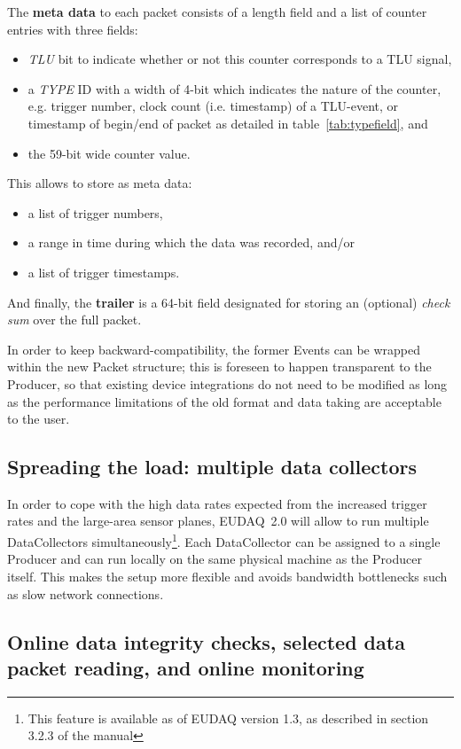 \documentclass[paper=a4, fontsize=11pt, titlepage]{scrartcl}	%
\numberwithin{equation}{section}		%
\numberwithin{figure}{section}			%
\numberwithin{table}{section}           	%
\begin{document}
The \textbf{meta data} to each packet consists of a length field and a
  list of counter entries with three fields: 
  \begin{itemize}
  \item \emph{TLU} bit to indicate whether or not this counter
    corresponds to a TLU signal,
  \item a \emph{TYPE} ID with a width of 4-bit which indicates the nature of the counter,
    e.g. trigger number, clock count (i.e. timestamp) of a TLU-event, or
    timestamp of begin/end of packet as detailed in table~\ref{tab:typefield}, and
  \item the 59-bit wide counter value.
  \end{itemize}
  This allows to store as meta data:
  \begin{itemize}
  \item a list of trigger numbers,
  \item a range in time during which the data was recorded, and/or
  \item a list of trigger timestamps.
  \end{itemize}

And finally, the \textbf{trailer} is a 64-bit field designated for
storing an (optional) \emph{check sum} over the full packet.

In order to keep backward-compatibility, the former Events can be
wrapped within the new Packet structure; this is foreseen to happen
transparent to the Producer, so that existing device integrations do
not need to be modified as long as the performance limitations of the
old format and data taking are acceptable to the user.


\subsection{Spreading the load: multiple data collectors}
\label{sec:datacollectors}

In order to cope with the high data rates expected from the
increased trigger rates and the large-area sensor planes, EUDAQ~2.0
will allow to run multiple DataCollectors simultaneously\footnote{This
feature is available as of EUDAQ version 1.3, as described in section
3.2.3 of the manual\cite{eudaqv13}}. Each DataCollector can be assigned to a single
Producer and can run locally on the same physical machine as the
Producer itself. This makes the setup more flexible and 
avoids bandwidth bottlenecks such as slow network connections.


\subsection{Online data integrity checks, selected data packet
  reading, and online monitoring}
\label{sec:integrity}
\end{document}
